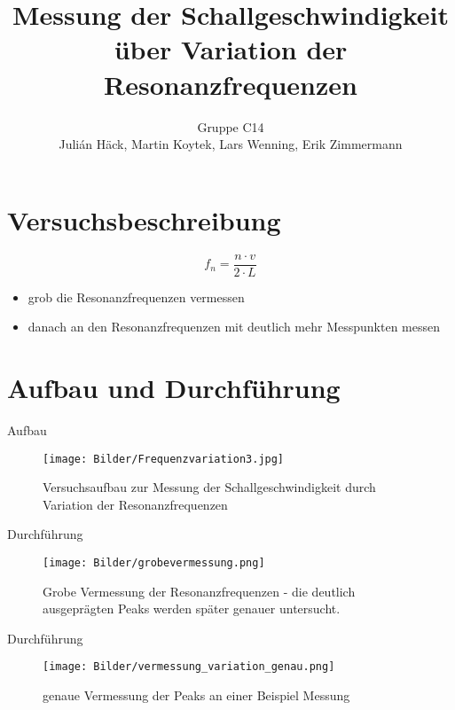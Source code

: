 \documentclass[11pt]{beamer}
\author{Gruppe C14 \\ Julián Häck, Martin Koytek, Lars Wenning, Erik Zimmermann}
\title{Messung der Schallgeschwindigkeit über Variation der Resonanzfrequenzen}
\begin{document}
\section{Versuchsbeschreibung}
\begin{frame}
\begin{equation}
f_n = \frac{n\cdot v}{2\cdot L}
\end{equation}
\begin{itemize}
\item grob die Resonanzfrequenzen vermessen
\item danach an den Resonanzfrequenzen mit deutlich mehr Messpunkten messen
\end{itemize} 
\end{frame}

\section{Aufbau und Durchführung}
\begin{frame}{Aufbau}
\begin{figure}[H]
\centering
\texttt{[image: Bilder/Frequenzvariation3.jpg]}
\caption{Versuchsaufbau zur Messung der Schallgeschwindigkeit durch Variation der Resonanzfrequenzen}
\end{figure}
\end{frame}

\begin{frame}{Durchführung}
\begin{figure}[H]
\centering
\texttt{[image: Bilder/grobevermessung.png]}
\caption{Grobe Vermessung der Resonanzfrequenzen - die deutlich ausgeprägten Peaks werden später genauer untersucht.}
\end{figure}
\end{frame}

\begin{frame}{Durchführung}
\begin{figure}[H]
\centering
\texttt{[image: Bilder/vermessung\_variation\_genau.png]}
\caption{genaue Vermessung der Peaks an einer Beispiel Messung}
\end{figure}
\end{frame}
\end{document}
